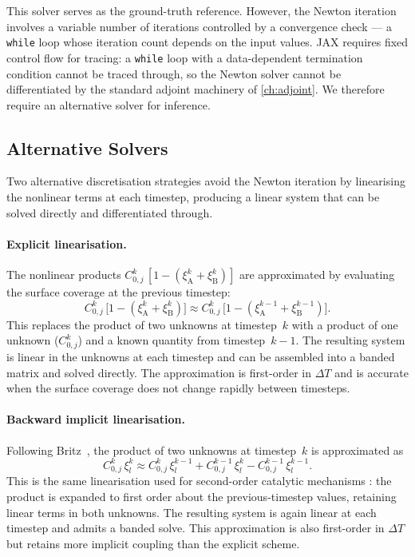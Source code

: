 This solver serves as the ground-truth reference. However, the
Newton iteration involves a variable number of iterations controlled by
a convergence check --- a \texttt{while} loop whose iteration count
depends on the input values. JAX requires fixed control flow for
tracing: a \texttt{while} loop with a data-dependent termination
condition cannot be traced through, so the Newton solver cannot be
differentiated by the standard adjoint machinery of
\cref{ch:adjoint}. We therefore require an alternative solver for
inference.

\subsection{Alternative Solvers}\label{sec:ads-alt-solvers}

Two alternative discretisation strategies avoid the Newton iteration by
linearising the nonlinear terms at each timestep, producing a linear
system that can be solved directly and differentiated through.

\paragraph{Explicit linearisation.}
The nonlinear products $C_{0,j}^k\,[1 - (\xi_\mathrm{A}^k +
\xi_\mathrm{B}^k)]$ are approximated by evaluating the surface
coverage at the previous timestep:
\begin{equation}\label{eq:ads-explicit}
  C_{0,j}^k\,\bigl[1 - (\xi_\mathrm{A}^k + \xi_\mathrm{B}^k)\bigr]
  \approx
  C_{0,j}^k\,\bigl[1 - (\xi_\mathrm{A}^{k-1} + \xi_\mathrm{B}^{k-1})\bigr].
\end{equation}
This replaces the product of two unknowns at timestep~$k$ with a
product of one unknown ($C_{0,j}^k$) and a known quantity from
timestep~$k-1$. The resulting system is linear in the unknowns at
each timestep and can be assembled into a banded matrix and solved
directly. The approximation is first-order in $\Delta T$ and is
accurate when the surface coverage does not change rapidly between
timesteps.

\paragraph{Backward implicit linearisation.}
Following Britz~\cite{britz2005digital}, the product of two unknowns
at timestep~$k$ is approximated as
\begin{equation}\label{eq:ads-britz}
  C_{0,j}^k\,\xi_l^k
  \approx
  C_{0,j}^k\,\xi_l^{k-1}
  + C_{0,j}^{k-1}\,\xi_l^k
  - C_{0,j}^{k-1}\,\xi_l^{k-1}.
\end{equation}
This is the same linearisation used for second-order catalytic
mechanisms \cite{compton2014understanding}: the product is expanded to
first order about the previous-timestep values, retaining linear terms
in both unknowns. The resulting system is again linear at each timestep
and admits a banded solve. This approximation is also first-order in
$\Delta T$ but retains more implicit coupling than the explicit
scheme.

